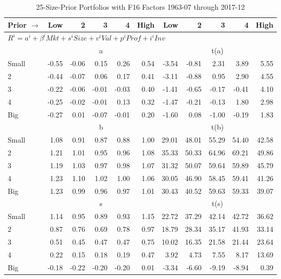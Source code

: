 
\begin{table}[!ht]
\footnotesize
\centering
\caption{25-Size-Prior Portfolios with F16 Factors 1963-07 through 2017-12}
\begin{tabular}{lrrrrrrrrrr}
  \toprule
    
    Prior $\rightarrow$ & Low & 2 & 3 & 4 & High & Low & 2 & 3 & 4 & High  \\ 
  \midrule
  \multicolumn{11}{l}{$R^i=a^i+\beta^iMkt+s^iSize+v^iVal+p^iProf+i^iInv$}  \\
  
     & \multicolumn{5}{c}{a} & \multicolumn{5}{c}{t(a)}   \\
     \cmidrule(r){2-6} \cmidrule(r){7-11} 
    Small  & -0.55  & -0.06  & 0.15  & 0.26  & 0.54  & -3.54  & -0.81  & 2.31  & 3.89  & 5.55   \\
    2  & -0.44  & -0.07  & 0.06  & 0.17  & 0.41  & -3.11  & -0.88  & 0.95  & 2.90  & 4.55   \\
    3  & -0.22  & -0.06  & -0.01  & -0.03  & 0.40  & -1.41  & -0.65  & -0.17  & -0.41  & 4.10   \\
    4  & -0.25  & -0.02  & -0.01  & 0.13  & 0.32  & -1.47  & -0.21  & -0.13  & 1.80  & 2.98   \\
    Big  & -0.27  & 0.01  & -0.07  & -0.01  & 0.20  & -1.60  & 0.08  & -1.00  & -0.19  & 1.83   \\
    
  
     & \multicolumn{5}{c}{b} & \multicolumn{5}{c}{t(b)}   \\
     \cmidrule(r){2-6} \cmidrule(r){7-11} 
    Small  & 1.08  & 0.91  & 0.87  & 0.88  & 1.00  & 29.01  & 48.01  & 55.29  & 54.40  & 42.58   \\
    2  & 1.21  & 1.01  & 0.95  & 0.96  & 1.08  & 35.33  & 50.33  & 64.96  & 69.21  & 49.86   \\
    3  & 1.19  & 1.03  & 0.97  & 0.98  & 1.07  & 31.32  & 50.07  & 59.64  & 59.89  & 45.79   \\
    4  & 1.23  & 1.10  & 1.02  & 1.00  & 1.06  & 30.05  & 46.90  & 58.45  & 59.41  & 41.26   \\
    Big  & 1.23  & 0.99  & 0.96  & 0.97  & 1.01  & 30.43  & 40.52  & 59.63  & 59.33  & 39.07   \\
    
  
     & \multicolumn{5}{c}{s} & \multicolumn{5}{c}{t(s)}   \\
     \cmidrule(r){2-6} \cmidrule(r){7-11} 
    Small  & 1.14  & 0.95  & 0.89  & 0.93  & 1.15  & 22.72  & 37.29  & 42.14  & 42.72  & 36.62   \\
    2  & 0.87  & 0.76  & 0.69  & 0.78  & 0.97  & 18.79  & 28.34  & 35.17  & 41.93  & 33.14   \\
    3  & 0.51  & 0.45  & 0.47  & 0.47  & 0.75  & 10.02  & 16.35  & 21.58  & 21.44  & 23.64   \\
    4  & 0.22  & 0.15  & 0.18  & 0.19  & 0.47  & 3.92  & 4.73  & 7.55  & 8.17  & 13.69   \\
    Big  & -0.18  & -0.22  & -0.20  & -0.20  & 0.01  & -3.34  & -6.60  & -9.19  & -8.94  & 0.39   \\
    

\end{tabular}
\end{table}
